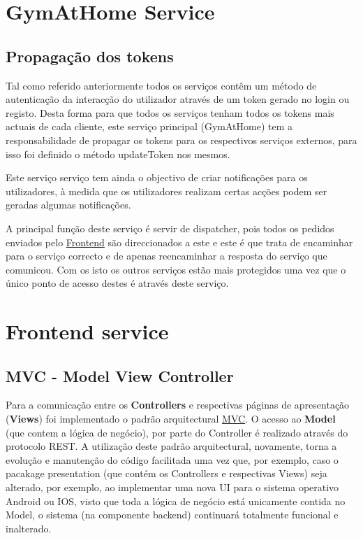\section{GymAtHome Service}

\subsection{Propagação dos tokens}

\hspace{5mm} Tal como referido anteriormente todos os serviços contêm um método de autenticação da interacção do utilizador através de um token gerado no login ou registo. Desta forma para que todos os serviços tenham todos os tokens mais actuais de cada cliente, este serviço principal (GymAtHome) tem a responsabilidade de propagar os tokens para os respectivos serviços externos, para isso foi definido o método updateToken nos mesmos.

\hspace{5mm} Este serviço serviço tem ainda o objectivo de criar notificações para os utilizadores, à medida que os utilizadores realizam certas acções podem ser geradas algumas notificações.

\hspace{5mm} A principal função deste serviço é servir de dispatcher, pois todos os pedidos enviados pelo \href{sec:frontend}{Frontend} são direccionados a este e este é que trata de encaminhar para o serviço correcto e de apenas reencaminhar a resposta do serviço que comunicou. Com os isto os outros serviços estão mais protegidos uma vez que o único ponto de acesso destes é através deste serviço.

\section{Frontend service}
\label{sec:frontend}

\subsection{MVC - Model View Controller}

\hspace{5mm} Para a comunicação entre os \textbf{Controllers} e respectivas páginas de apresentação (\textbf{Views}) foi implementado o padrão arquitectural \href{https://en.wikipedia.org/wiki/Model\%E2\%80\%93view\%E2\%80\%93controller}{MVC}. O acesso ao \textbf{Model} (que contem a lógica de negócio), por parte do Controller é realizado através do protocolo REST. A utilização deste padrão arquitectural, novamente, torna a evolução e manutenção do código facilitada uma vez que, por exemplo, caso o pacakage presentation (que contém os Controllers e respectivas Views) seja alterado, por exemplo, ao implementar uma nova UI para o sistema operativo Android ou IOS, visto que toda a lógica de negócio está unicamente contida no Model, o sistema (na componente backend) continuará totalmente funcional e inalterado.